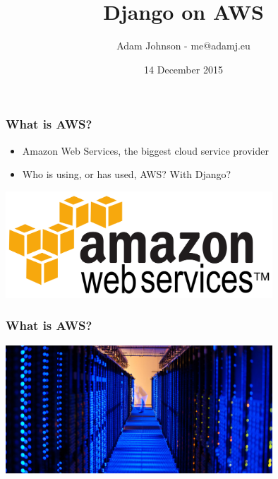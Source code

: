 \documentclass{beamer}
\title{Django on AWS}
\author{Adam Johnson - me@adamj.eu}
\date{14 December 2015}
\begin{document}
\maketitle


\begin{frame}[fragile]\frametitle{What is AWS?}

    \begin{itemize}
        \item Amazon Web Services, the biggest cloud service provider
        \item Who is using, or has used, AWS? With Django?
    \end{itemize}

    \begin{center}
        \includegraphics[width=10cm]{aws}
    \end{center}

\end{frame}


\begin{frame}[fragile]\frametitle{What is AWS?}

    \begin{center}
        \includegraphics[width=10cm]{aws-dc}
    \end{center}

\end{frame}
\end{document}
